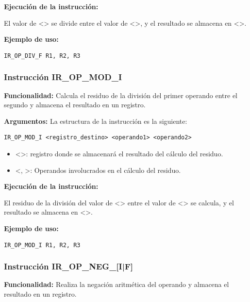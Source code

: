 \noindent
\textbf{Ejecución de la instrucción:}
\vspace{0.3cm}

\noindent
El valor de <> se divide entre el valor de <>, y el resultado se almacena en <>.
\vspace{0.3cm}

\noindent
\textbf{Ejemplo de uso:}
\begin{verbatim}
IR_OP_DIV_F R1, R2, R3
\end{verbatim}

\subsubsection{Instrucción IR\_OP\_MOD\_I}\label{subsubsec:IR_OP_MOD}
\noindent
\textbf{Funcionalidad:} Calcula el residuo de la división del primer operando entre el segundo y almacena el resultado en un registro.

\noindent
\textbf{Argumentos:} La estructura de la instrucción es la siguiente:
\begin{verbatim}
IR_OP_MOD_I <registro_destino> <operando1> <operando2>
\end{verbatim}
\begin{itemize}
    \item <>: registro donde se almacenará el resultado del cálculo del residuo.
    \item <, >: Operandos involucrados en el cálculo del residuo.
\end{itemize}

\noindent
\textbf{Ejecución de la instrucción:}
\vspace{0.3cm}

\noindent
El residuo de la división del valor de <> entre el valor de <> se calcula, y el resultado se almacena en <>.
\vspace{0.3cm}

\noindent
\textbf{Ejemplo de uso:}
\begin{verbatim}
IR_OP_MOD_I R1, R2, R3
\end{verbatim}

\subsubsection{Instrucción IR\_OP\_NEG\_[I|F]}\label{subsubsec:IR_OP_NEG}
\noindent
\textbf{Funcionalidad:} Realiza la negación aritmética del operando y almacena el resultado en un registro.

